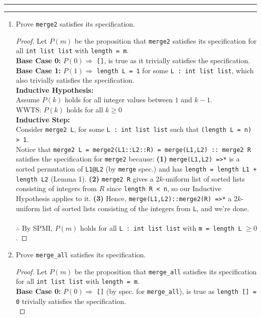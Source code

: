 \documentclass[11pt]{article}
\newcommand{\question}[2] {\vspace{.25in} \hrule\vspace{0.5em}
\noindent{\bf #1: #2} \vspace{0.5em}
\hrule \vspace{.10in}}
\begin{document}
\question{4}{Short Circuitry}
\begin{enumerate}
\item Prove \verb|merge2| satisfies its specification.
\begin{proof}
Let $P(m)$ be the proposition that \verb|merge2| satisfies its specification for all \verb|int list list| with \verb|length = m|.\\
\textbf{Base Case 0:} $P(0) \Rightarrow$ \verb|[]|, is true as it trivially satisfies the specification.\\
\textbf{Base Case 1:} $P(1) \Rightarrow$ \verb|length L = 1| for some \verb|L : int list list|, which also trivially satisfies the specification.\\
\textbf{Inductive Hypothesis:}\\
 Assume $P(k)$ holds for all integer values between $1$ and $k-1$.\\
WWTS: $P(k)$ holds for all $k \geq 0$\\
\textbf{Inductive Step:} \\
Consider \verb|merge2 L|, for some \verb|L : int list list| such that \verb|(length L = n) > 1|.\\
Notice that \verb|merge2 L = merge2(L1::L2::R) = merge(L1,L2) :: merge2 R| satisfies the specification for \verb|merge2| because: \textbf{(1)} \verb|merge(L1,L2) =>*| is a sorted permutation of \verb|L1@L2| (by \verb|merge| spec.) and has \verb|length = length L1 + length L2| (Lemma 1).  \textbf{(2)} \verb|merge2 R| gives a 2$k$-uniform list of sorted lists consisting of integers from $R$ since \verb|length R < n|, so our Inductive Hypothesis applies to it.  \textbf{(3)} Hence, \verb|merge(L1,L2)::merge2(R) =>*| a 2$k$-uniform list of sorted lists consisting of the integers from \verb|L|, and we're done.\\\\
$\therefore$ By SPMI, $P(m)$ holds for all \verb|L : int list list| with \verb|m = length L| $\geq 0$.
\end{proof}
\item Prove \verb|merge_all| satisfies its specification.
\begin{proof}
Let $P(m)$ be the proposition that \verb|merge_all| satisfies its specification for all \verb|int list list| with \verb|length = m|.\\
\textbf{Base Case 0:} $P(0) \Rightarrow$ \verb|[]| (by spec. for \verb|merge_all|), is true as \verb|length [] = 0| trivially satisfies the specification.\\

\end{proof}
\end{enumerate}
\end{document}
